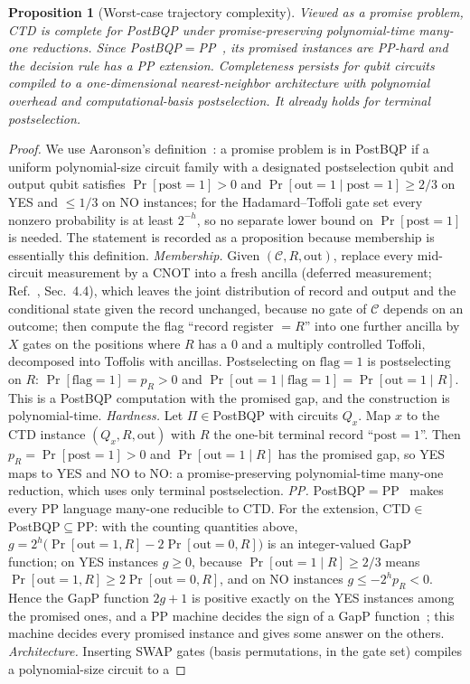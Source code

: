 \documentclass[aps,prx,reprint,superscriptaddress,nobibnotes,longbibliography]{revtex4-2}
\newtheorem{proposition}{Proposition}
\theoremstyle{remark}
\begin{document}
\begin{proposition}[Worst-case trajectory complexity]
\label{thm:complexity}
Viewed as a promise problem, CTD is complete for PostBQP under promise-preserving polynomial-time many-one reductions.  Since PostBQP$=$PP~\cite{Aaronson2005}, its promised instances are PP-hard and the decision rule has a PP extension.  Completeness persists for qubit circuits compiled to a one-dimensional nearest-neighbor architecture with polynomial overhead and computational-basis postselection.  It already holds for terminal postselection.
\end{proposition}

\begin{proof}
We use Aaronson's definition~\cite{Aaronson2005}: a promise problem is in PostBQP if a uniform polynomial-size circuit family with a designated postselection qubit and output qubit satisfies $\Pr[\mathrm{post}=1]>0$ and $\Pr[\mathrm{out}=1\mid\mathrm{post}=1]\ge2/3$ on YES and $\le1/3$ on NO instances; for the Hadamard--Toffoli gate set every nonzero probability is at least $2^{-h}$, so no separate lower bound on $\Pr[\mathrm{post}=1]$ is needed.  The statement is recorded as a proposition because membership is essentially this definition.  \emph{Membership.}  Given $(\mathcal C,R,\mathrm{out})$, replace every mid-circuit measurement by a CNOT into a fresh ancilla (deferred measurement; Ref.~\cite{NielsenChuang2010}, Sec.~4.4), which leaves the joint distribution of record and output and the conditional state given the record unchanged, because no gate of $\mathcal C$ depends on an outcome; then compute the flag ``record register $=R$'' into one further ancilla by $X$ gates on the positions where $R$ has a $0$ and a multiply controlled Toffoli, decomposed into Toffolis with ancillas.  Postselecting on $\mathrm{flag}=1$ is postselecting on $R$: $\Pr[\mathrm{flag}=1]=p_R>0$ and $\Pr[\mathrm{out}=1\mid\mathrm{flag}=1]=\Pr[\mathrm{out}=1\mid R]$.  This is a PostBQP computation with the promised gap, and the construction is polynomial-time.  \emph{Hardness.}  Let $\Pi\in{}$PostBQP with circuits $Q_x$.  Map $x$ to the CTD instance $(Q_x,R,\mathrm{out})$ with $R$ the one-bit terminal record ``$\mathrm{post}=1$''.  Then $p_R=\Pr[\mathrm{post}=1]>0$ and $\Pr[\mathrm{out}=1\mid R]$ has the promised gap, so YES maps to YES and NO to NO: a promise-preserving polynomial-time many-one reduction, which uses only terminal postselection.  \emph{PP.}  PostBQP$=$PP~\cite{Aaronson2005} makes every PP language many-one reducible to CTD.  For the extension, CTD$\in$PostBQP$\subseteq$PP: with the counting quantities above, $g=2^h\bigl(\Pr[\mathrm{out}=1,R]-2\Pr[\mathrm{out}=0,R]\bigr)$ is an integer-valued GapP function; on YES instances $g\ge0$, because $\Pr[\mathrm{out}=1\mid R]\ge2/3$ means $\Pr[\mathrm{out}=1,R]\ge2\Pr[\mathrm{out}=0,R]$, and on NO instances $g\le-2^hp_R<0$.  Hence the GapP function $2g+1$ is positive exactly on the YES instances among the promised ones, and a PP machine decides the sign of a GapP function~\cite{Fenner1994}; this machine decides every promised instance and gives some answer on the others.  \emph{Architecture.}  Inserting SWAP gates (basis permutations, in the gate set) compiles a polynomial-size circuit to a 
\end{proof}
\end{document}
